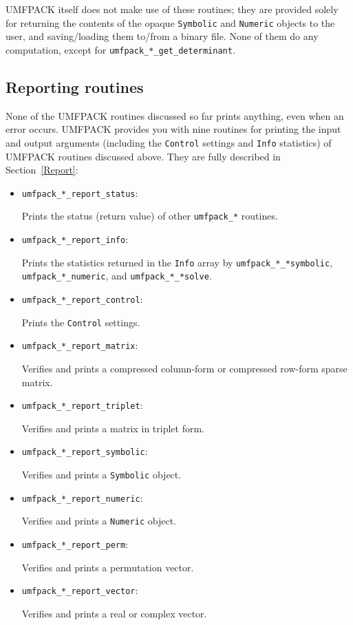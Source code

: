 \documentclass[11pt]{article}
\begin{document}
UMFPACK itself does not make use of these routines;
they are provided solely for returning the contents of the opaque
{\tt Symbolic} and {\tt Numeric} objects to the user, and saving/loading
them to/from a binary file.  None of them do any computation, except for
{\tt umfpack\_*\_get\_determinant}.

\subsection{Reporting routines}
\label{Reporting}

None of the UMFPACK routines discussed so far prints anything, even when an
error occurs.  UMFPACK provides you with nine routines for printing the input
and output arguments (including the {\tt Control} settings and {\tt Info}
statistics) of UMFPACK routines discussed above.  They are fully described in
Section~\ref{Report}:

\begin{itemize}
\item {\tt umfpack\_*\_report\_status}:

    Prints the status (return value) of other {\tt umfpack\_*} routines.

\item {\tt umfpack\_*\_report\_info}:

    Prints the statistics returned in the {\tt Info} array by
    {\tt umfpack\_*\_*symbolic},
    {\tt umfpack\_*\_numeric}, and {\tt umfpack\_*\_*solve}.

\item {\tt umfpack\_*\_report\_control}:

    Prints the {\tt Control} settings.

\item {\tt umfpack\_*\_report\_matrix}:

    Verifies and prints a compressed column-form or compressed row-form sparse
    matrix.

\item {\tt umfpack\_*\_report\_triplet}:

    Verifies and prints a matrix in triplet form.

\item {\tt umfpack\_*\_report\_symbolic}:

    Verifies and prints a {\tt Symbolic} object.

\item {\tt umfpack\_*\_report\_numeric}:

    Verifies and prints a {\tt Numeric} object.

\item {\tt umfpack\_*\_report\_perm}:

    Verifies and prints a permutation vector.

\item {\tt umfpack\_*\_report\_vector}:

    Verifies and prints a real or complex vector.

\end{itemize}
\end{document}
